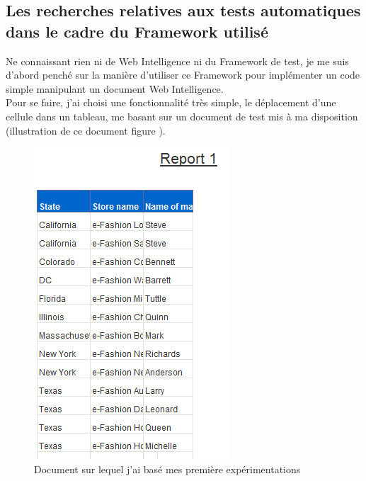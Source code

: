 \subsection{Les recherches relatives aux tests automatiques dans le cadre du \gls{Framework} utilis\'{e}}


Ne connaissant rien ni de Web Intelligence ni du \gls{Framework} de test, je me suis d'abord pench\'{e} sur la mani\`{e}re d'utiliser ce \gls{Framework} pour impl\'{e}menter un code simple manipulant un document Web Intelligence.\\

Pour se faire, j'ai choisi une fonctionnalit\'{e} tr\`{e}s simple, le d\'{e}placement d'une cellule dans un tableau, me basant sur un document de test mis \`{a} ma disposition (illustration de ce document figure \pageref{figure:docsample}).\\

\begin{figure}[!h]
  \centering
      \includegraphics{images/docsample.png}
  \caption{Document sur lequel j'ai bas\'{e} mes premi\`{e}re exp\'{e}rimentations}
	\label{figure:docsample}
\end{figure}
 
